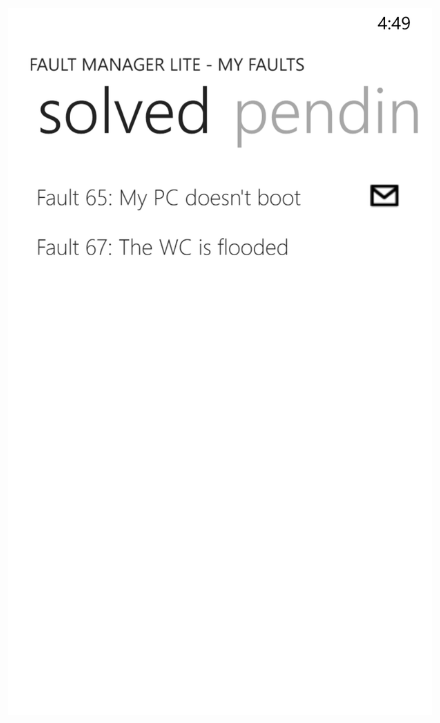 \documentclass{report}
\begin{document}
\begin{figure}[hbtp]
\centering
\begin{minipage}{0.3\textwidth}
\includegraphics[width=\textwidth]{img/FaultLog.png}
\end{minipage}
\hspace{0.02\textwidth}
\begin{minipage}{0.3\textwidth}

\end{minipage}
\end{figure}
\end{document}
